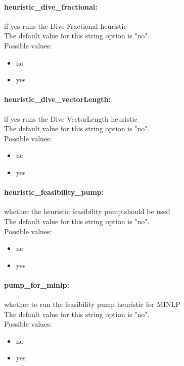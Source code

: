 \paragraph{heuristic\_dive\_fractional:}\label{opt:heuristic_dive_fractional} if yes runs the Dive Fractional heuristic \\
 The default value for this string option is "no".
\\ 
Possible values:
\begin{itemize}
   \item no
   \item yes
\end{itemize}

\paragraph{heuristic\_dive\_vectorLength:}\label{opt:heuristic_dive_vectorLength} if yes runs the Dive VectorLength heuristic \\
 The default value for this string option is "no".
\\ 
Possible values:
\begin{itemize}
   \item no
   \item yes
\end{itemize}

\paragraph{heuristic\_feasibility\_pump:}\label{opt:heuristic_feasibility_pump} whether the heuristic feasibility pump should be used \\
 The default value for this string option is "no".
\\ 
Possible values:
\begin{itemize}
   \item no
   \item yes
\end{itemize}

\paragraph{pump\_for\_minlp:}\label{opt:pump_for_minlp} whether to run the feasibility pump heuristic for MINLP \\
 The default value for this string option is "no".
\\ 
Possible values:
\begin{itemize}
   \item no
   \item yes
\end{itemize}

